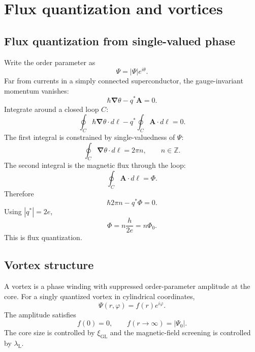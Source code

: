 \documentclass[11pt]{article}
\numberwithin{equation}{section}
\newcommand{\Avec}{\bm{A}}
\renewcommand{\grad}{\bm{\nabla}}
\newcommand{\xiGL}{\xi_{\mathrm{GL}}}
\newcommand{\lambdaL}{\lambda_{\mathrm{L}}}
\newcommand{\Phizero}{\Phi_0}
\newcommand{\Ord}{\Psi}
\begin{document}
\section{Flux quantization and vortices}

\subsection{Flux quantization from single-valued phase}

Write the order parameter as
\begin{equation}
\Ord=|\Ord|e^{i\theta}.
\end{equation}
Far from currents in a simply connected superconductor, the gauge-invariant momentum vanishes:
\begin{equation}
\hbar\grad\theta-q^*\Avec=0.
\end{equation}
Integrate around a closed loop $C$:
\begin{equation}
\oint_C\hbar\grad\theta\cdot d\bm{\ell}-q^*\oint_C\Avec\cdot d\bm{\ell}=0.
\end{equation}
The first integral is constrained by single-valuedness of $\Ord$:
\begin{equation}
\oint_C\grad\theta\cdot d\bm{\ell}=2\pi n,
\qquad n\in\mathbb{Z}.
\end{equation}
The second integral is the magnetic flux through the loop:
\begin{equation}
\oint_C\Avec\cdot d\bm{\ell}=\Phi.
\end{equation}
Therefore
\begin{equation}
\hbar 2\pi n-q^*\Phi=0.
\end{equation}
Using $|q^*|=2e$,
\begin{equation}
\boxed{\Phi=n\frac{h}{2e}=n\Phizero.}
\end{equation}
This is flux quantization.

\subsection{Vortex structure}

A vortex is a phase winding with suppressed order-parameter amplitude at the core. For a singly quantized vortex in cylindrical coordinates,
\begin{equation}
\Ord(r,\varphi)=f(r)e^{i\varphi}.
\end{equation}
The amplitude satisfies
\begin{equation}
f(0)=0,
\qquad
f(r\to\infty)=|\Ord_0|.
\end{equation}
The core size is controlled by $\xiGL$ and the magnetic-field screening is controlled by $\lambdaL$.
\end{document}
